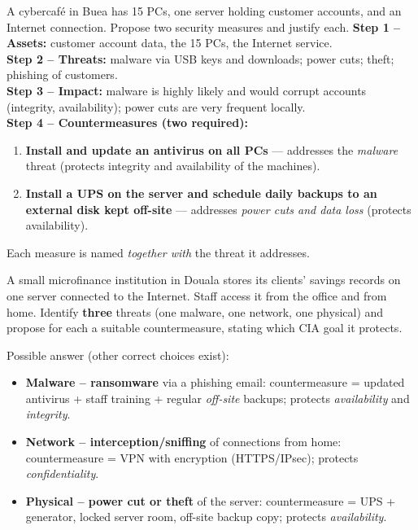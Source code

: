 \documentclass[11pt]{article}
\begin{document}
\begin{exoresolu}
A cybercafé in Buea has 15 PCs, one server holding customer accounts, and an Internet connection. Propose two security measures and justify each.
\tcblower
\textbf{Step 1 -- Assets:} customer account data, the 15 PCs, the Internet service.\\
\textbf{Step 2 -- Threats:} malware via USB keys and downloads; power cuts; theft; phishing of customers.\\
\textbf{Step 3 -- Impact:} malware is highly likely and would corrupt accounts (integrity, availability); power cuts are very frequent locally.\\
\textbf{Step 4 -- Countermeasures (two required):}
\begin{enumerate}
\item \textbf{Install and update an antivirus on all PCs} --- addresses the \emph{malware} threat (protects integrity and availability of the machines).
\item \textbf{Install a UPS on the server and schedule daily backups to an external disk kept off-site} --- addresses \emph{power cuts and data loss} (protects availability).
\end{enumerate}
Each measure is named \emph{together with} the threat it addresses.
\end{exoresolu}

\begin{exercice}
A small microfinance institution in Douala stores its clients' savings records on one server connected to the Internet. Staff access it from the office and from home. Identify \textbf{three} threats (one malware, one network, one physical) and propose for each a suitable countermeasure, stating which CIA goal it protects.
\end{exercice}

\begin{corrige}[Exercise 1]
Possible answer (other correct choices exist):
\begin{itemize}
\item \textbf{Malware -- ransomware} via a phishing email: countermeasure = updated antivirus + staff training + regular \emph{off-site} backups; protects \emph{availability} and \emph{integrity}.
\item \textbf{Network -- interception/sniffing} of connections from home: countermeasure = VPN with encryption (HTTPS/IPsec); protects \emph{confidentiality}.
\item \textbf{Physical -- power cut or theft} of the server: countermeasure = UPS + generator, locked server room, off-site backup copy; protects \emph{availability}.
\end{itemize}
\end{corrige}
\end{document}

